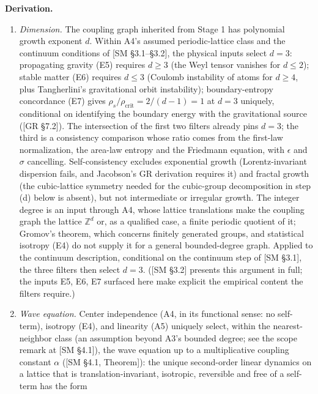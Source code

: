 \documentclass[
]{article}
\begin{document}
\textbf{Derivation.}

\begin{enumerate}
\def\labelenumi{(\alph{enumi})}
\item
  \emph{Dimension.} The coupling graph inherited from Stage 1 has
  polynomial growth exponent \(d\). Within A4's assumed periodic-lattice
  class and the continuum conditions of {[}SM §3.1--§3.2{]}, the
  physical inputs select \(d=3\): propagating gravity (E5) requires
  \(d \geq 3\) (the Weyl tensor vanishes for \(d \leq 2\)); stable
  matter (E6) requires \(d \leq 3\) (Coulomb instability of atoms for
  \(d \geq 4\), plus Tangherlini's gravitational orbit instability);
  boundary-entropy concordance (E7) gives
  \(\rho_s / \rho_{\text{crit}} = 2/(d-1) = 1\) at \(d = 3\) uniquely,
  conditional on identifying the boundary energy with the gravitational
  source ({[}GR §7.2{]}). The intersection of the first two filters
  already pins \(d = 3\); the third is a consistency comparison whose
  ratio comes from the first-law normalization, the area-law entropy and
  the Friedmann equation, with \(\epsilon\) and \(\sigma\) cancelling.
  Self-consistency excludes exponential growth (Lorentz-invariant
  dispersion fails, and Jacobson's GR derivation requires it) and
  fractal growth (the cubic-lattice symmetry needed for the cubic-group
  decomposition in step (d) below is absent), but not intermediate or
  irregular growth. The integer degree is an input through A4, whose
  lattice translations make the coupling graph the lattice
  \(\mathbb{Z}^d\) or, as a qualified case, a finite periodic quotient
  of it; Gromov's theorem, which concerns finitely generated groups, and
  statistical isotropy (E4) do not supply it for a general
  bounded-degree graph. Applied to the continuum description,
  conditional on the continuum step of {[}SM §3.1{]}, the three filters
  then select \(d = 3\). ({[}SM §3.2{]} presents this argument in full;
  the inputs E5, E6, E7 surfaced here make explicit the empirical
  content the filters require.)
\item
  \emph{Wave equation.} Center independence (A4, in its functional
  sense: no self-term), isotropy (E4), and linearity (A5) uniquely
  select, within the nearest-neighbor class (an assumption beyond A3's
  bounded degree; see the scope remark at {[}SM §4.1{]}), the wave
  equation up to a multiplicative coupling constant \(\alpha\) ({[}SM
  §4.1, Theorem{]}): the unique second-order linear dynamics on a
  lattice that is translation-invariant, isotropic, reversible and free
  of a self-term has the form

\end{enumerate}
\end{document}
